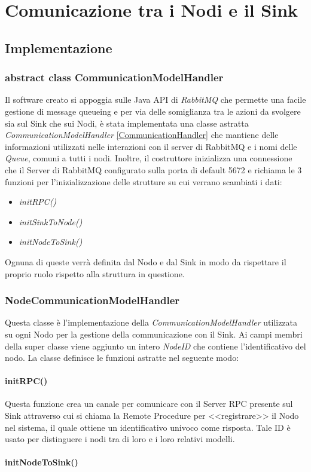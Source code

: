 \chapter{Comunicazione tra i Nodi e il Sink}


  \section{Implementazione}
    \subsection{abstract class CommunicationModelHandler}
      Il software creato si appoggia sulle Java API di \textit{RabbitMQ} che permette una facile gestione di message queueing e per via delle somiglianza tra le azioni da svolgere sia sul Sink che sui Nodi, è stata implementata una classe astratta \textit{CommunicationModelHandler} \ref{CommunicationHandler} che mantiene delle informazioni utilizzati nelle interazioni con il server di RabbitMQ e i nomi delle \textit{Queue}, comuni a tutti i nodi. Inoltre, il costruttore inizializza una connessione che il Server di RabbitMQ configurato sulla porta di default 5672 e richiama le 3 funzioni per l'inizializzazione delle strutture su cui verrano scambiati i dati:
      \begin{itemize}
        \item \textit{initRPC()}
        \item \textit{initSinkToNode()}
        \item \textit{initNodeToSink()}
      \end{itemize}
      Ognuna di queste verrà definita dal Nodo e dal Sink in modo da rispettare il proprio ruolo rispetto alla struttura in questione.
      

    \subsection{NodeCommunicationModelHandler}
      Questa classe è l'implementazione della \textit{CommunicationModelHandler} utilizzata su ogni Nodo per la gestione della communicazione con il Sink. Ai campi membri della super classe viene aggiunto un intero \textit{NodeID} che contiene l'identificativo del nodo. La classe definisce le funzioni astratte nel seguente modo:
      \subsubsection{initRPC()}
        Questa funzione crea un canale per comunicare con il Server RPC presente sul Sink attraverso cui si chiama la Remote Procedure per <<registrare>> il Nodo nel sistema, il quale ottiene un identificativo univoco come risposta. Tale ID è usato per distinguere i nodi tra di loro e i loro relativi modelli.
        

      \subsubsection{initNodeToSink()}
